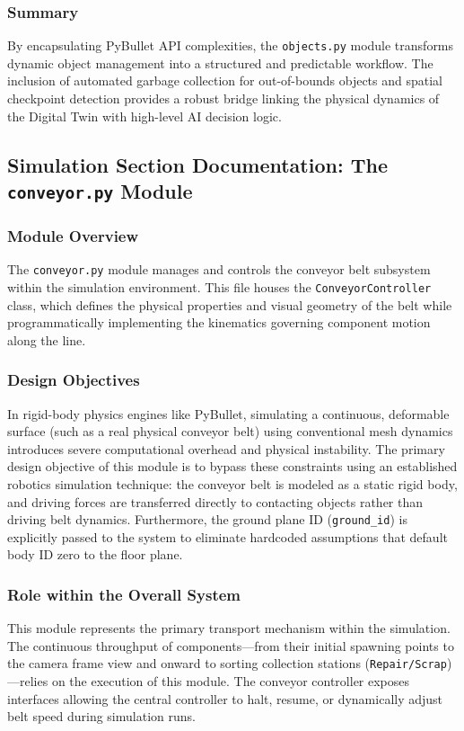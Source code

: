 \documentclass{article}
\begin{document}
\subsubsection{Summary}
By encapsulating PyBullet API complexities, the \texttt{objects.py} module transforms dynamic object management into a structured and predictable workflow. The inclusion of automated garbage collection for out-of-bounds objects and spatial checkpoint detection provides a robust bridge linking the physical dynamics of the Digital Twin with high-level AI decision logic.

\subsection{Simulation Section Documentation: The \texttt{conveyor.py} Module}

\subsubsection{Module Overview}
The \texttt{conveyor.py} module manages and controls the conveyor belt subsystem within the simulation environment. This file houses the \texttt{ConveyorController} class, which defines the physical properties and visual geometry of the belt while programmatically implementing the kinematics governing component motion along the line.

\subsubsection{Design Objectives}
In rigid-body physics engines like PyBullet, simulating a continuous, deformable surface (such as a real physical conveyor belt) using conventional mesh dynamics introduces severe computational overhead and physical instability. The primary design objective of this module is to bypass these constraints using an established robotics simulation technique: the conveyor belt is modeled as a static rigid body, and driving forces are transferred directly to contacting objects rather than driving belt dynamics. Furthermore, the ground plane ID (\texttt{ground\_id}) is explicitly passed to the system to eliminate hardcoded assumptions that default body ID zero to the floor plane.

\subsubsection{Role within the Overall System}
This module represents the primary transport mechanism within the simulation. The continuous throughput of components—from their initial spawning points to the camera frame view and onward to sorting collection stations (\texttt{Repair/Scrap})—relies on the execution of this module. The conveyor controller exposes interfaces allowing the central controller to halt, resume, or dynamically adjust belt speed during simulation runs.
\end{document}
